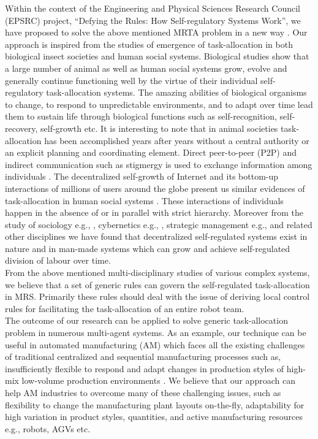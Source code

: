 %
Within the context of the Engineering and Physical Sciences Research Council (EPSRC) project, ``Defying the Rules: How Self-regulatory Systems Work'', we have proposed to solve the above mentioned MRTA problem in a new way \cite{Arcaute+2008}. Our approach is inspired from the studies of emergence of task-allocation in both biological insect societies and human social systems. Biological studies show that a large number of animal as well as human social systems grow, evolve and generally continue functioning well by the virtue of their individual self-regulatory task-allocation systems. The amazing abilities of biological organisms to change, to respond to unpredictable environments, and to adapt over time lead them to sustain life through biological functions such as self-recognition, self-recovery, self-growth etc. It is interesting to note that in animal societies task-allocation has been accomplished years after years without a central authority or an explicit planning and coordinating element. Direct peer-to-peer (P2P) and indirect communication such as stigmergy is  used to exchange information among individuals \cite{Camazine+2001}. The decentralized self-growth of Internet and its bottom-up interactions of millions of users around the globe present us similar evidences of task-allocation in human social systems \cite{Andriani+2004}. These interactions of individuals happen in the absence of or in parallel with strict hierarchy. Moreover from the study of sociology e.g., \cite{Sayer+1992}, cybernetics e.g., \cite{Beer1981}, strategic management e.g., \cite{Kogut2000} and related other disciplines we have found that decentralized self-regulated systems exist in nature and in man-made systems which can grow and achieve self-regulated division of labour over time.\\
% 
From the above mentioned multi-disciplinary studies of various complex systems, we believe that a set of generic rules can govern the self-regulated task-allocation in MRS. Primarily these rules should deal with the issue of deriving local control rules for facilitating the task-allocation of an entire robot team.\\
% 
The outcome of our research can be applied to solve generic task-allocation problem in numerous multi-agent systems. As an example, our technique can be useful in automated manufacturing (AM) which faces all the existing challenges of traditional centralized and sequential manufacturing processes such as, insufficiently flexible to respond and adapt changes in production styles of high-mix low-volume production environments \cite{Shen+2006}. We believe that our approach can help AM industries to overcome many of these challenging issues, such as flexibility to change the manufacturing plant layouts on-the-fly, adaptability for high variation in product styles, quantities, and active manufacturing resources e.g., robots, AGVs etc.
%
